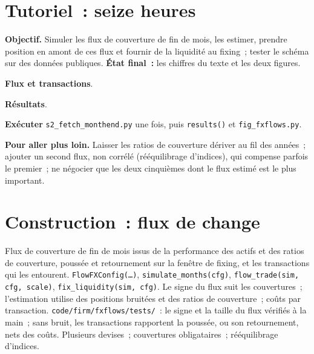 \section{Tutoriel~: seize heures}\label{tut:s2:fx-flow-strategies:tut}

\begin{tutorial}
\textbf{Objectif.} Simuler les flux de couverture de fin de mois, les estimer, prendre position en amont de ces flux et fournir de la liquidité au fixing~; tester le schéma sur des données publiques.
\textbf{État final~:} les chiffres du texte et les deux figures.
\begin{tutsteps}
\item \textbf{Flux et transactions}.
\label{lst:s2:fx-flow-strategies:model}
\item \textbf{Résultats}.
\label{lst:s2:fx-flow-strategies:results}
\item \textbf{Exécuter} \texttt{s2\_fetch\_monthend.py} une fois, puis \texttt{results()} et \texttt{fig\_fxflows.py}.
\end{tutsteps}
\textbf{Pour aller plus loin.} Laisser les ratios de couverture dériver au fil des années~; ajouter un second flux, non corrélé (rééquilibrage d'indices), qui compense parfois le
premier~; ne négocier que les deux cinquièmes dont le flux estimé est le plus important.
\end{tutorial}

\section{Construction~: flux de change}\label{bld:s2:fx-flow-strategies:fxflows}

\begin{build}
 Flux de couverture de fin de mois issus de la performance des actifs et des ratios de couverture, poussée et retournement sur la fenêtre de fixing, et les transactions qui les entourent.
 \texttt{FlowFXConfig(\dots)}, \texttt{simulate\_months(cfg)}, \texttt{flow\_trade(sim, cfg, scale)},
\texttt{fix\_liquidity(sim, cfg)}.
 Le signe du flux suit les couvertures~; l'estimation utilise des positions bruitées et des ratios de couverture~; coûts par transaction.
 \texttt{code/firm/fxflows/tests/}~: le signe et la taille du flux vérifiés à la main~; sans bruit, les transactions rapportent la poussée, ou son
retournement, nets des coûts.
 Plusieurs devises~; couvertures obligataires~; rééquilibrage d'indices.
\end{build}

